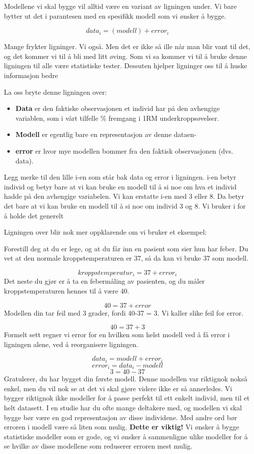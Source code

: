 \documentclass[
]{book}
\begin{document}
Modellene vi skal bygge vil alltid være en variant av ligningen under. Vi bare bytter ut det i parantesen med en spesifikk modell som vi ønsker å bygge.

\[
data_i = (modell) + error_i
\]

Mange frykter ligninger. Vi også. Men det er ikke så ille når man blir vant til det, og det kommer vi til å bli med litt øving. Som vi sa kommer vi til å bruke denne ligningen til alle være statistiske tester. Dessuten hjelper ligninger oss til å huske informasjon bedre

La oss bryte denne ligningen over:

\begin{itemize}
\item
  \textbf{Data} er den faktiske observasjonen et individ har på den avhengige variablen, som i vårt tilfelle \% fremgang i 1RM underkroppsøvelser.
\item
  \textbf{Modell} er egentlig bare en representasjon av denne dataen-
\item
  \textbf{error} er hvor mye modellen bommer fra den faktisk observasjonen (dvs. data).
\end{itemize}

Legg merke til den lille i-en som står bak data og error i ligningen. i-en betyr individ og betyr bare at vi kan bruke en modell til å si noe om hva et individ hadde på den avhengige variabelen. Vi kan erstatte i-en med 3 eller 8. Da betyr det bare at vi kan bruke en modell til å si noe om individ 3 og 8. Vi bruker i for å holde det generelt

Ligningen over blir nok mer oppklarende om vi bruker et eksempel:

Forestill deg at du er lege, og at du får inn en pasient som sier hun har feber. Du vet at den normale kroppstemperaturen er 37, så da kan vi bruke 37 som modell.

\[
kroppstemperatur_i = 37 + error_i
\]
Det neste du gjør er å ta en febermåling av pasienten, og du måler kroppstemperaturen hennes til å være 40.

\[
40 = 37 + error
\]
Modellen din tar feil med 3 grader, fordi 40-37 = 3. Vi kaller slike feil for error.

\[
40 = 37 + 3
\]
Formelt sett regner vi error for en hvilken som helst modell ved å få error i ligningen alene, ved å reorganisere ligningen.

\[
data_i = modell + error_i
\]
\[
error_i = data_i - modell
\]
\[
3 = 40 - 37
\]
Gratulerer, du har bygget din første modell. Denne modellen var riktignok nokså enkel, men du vil nok se at det vi skal gjøre videre ikke er så annerledes. Vi bygger riktignok ikke modeller for å passe perfekt til ett enkelt individ, men til et helt datasett. I en studie har du ofte mange deltakere med, og modellen vi skal bygge bør være en god representasjon av disse individene. Med andre ord bør erroren i modell være så liten som mulig. \textbf{Dette er viktig!} Vi ønsker å bygge statistiske modeller som er gode, og vi ønsker å sammenligne ulike modeller for å se hvilke av disse modellene som reduserer erroren mest mulig.
\end{document}
